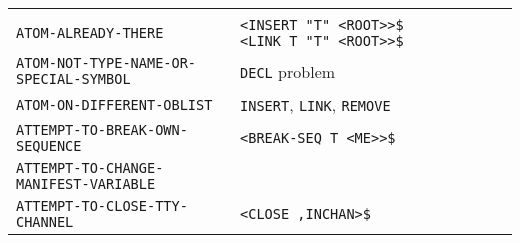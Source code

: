 \documentclass[a4paper,]{article}
\begin{document}
\begin{longtable}[]{@{}ll@{}}
\begin{minipage}[t]{0.36\columnwidth}
\end{minipage}\tabularnewline
\begin{minipage}[t]{0.58\columnwidth}\raggedright\strut
\texttt{ATOM-ALREADY-THERE}\strut
\end{minipage} & \begin{minipage}[t]{0.36\columnwidth}\raggedright\strut
\texttt{\textless{}INSERT\ "T"\ \textless{}ROOT\textgreater{}\textgreater{}\$}
\texttt{\textless{}LINK\ \textquotesingle{}T\ "T"\ \textless{}ROOT\textgreater{}\textgreater{}\$}\strut
\end{minipage}\tabularnewline
\begin{minipage}[t]{0.58\columnwidth}\raggedright\strut
\texttt{ATOM-NOT-TYPE-NAME-OR-SPECIAL-SYMBOL}\strut
\end{minipage} & \begin{minipage}[t]{0.36\columnwidth}\raggedright\strut
\texttt{DECL} problem\strut
\end{minipage}\tabularnewline
\begin{minipage}[t]{0.58\columnwidth}\raggedright\strut
\texttt{ATOM-ON-DIFFERENT-OBLIST}\strut
\end{minipage} & \begin{minipage}[t]{0.36\columnwidth}\raggedright\strut
\texttt{INSERT}, \texttt{LINK}, \texttt{REMOVE}\strut
\end{minipage}\tabularnewline
\begin{minipage}[t]{0.58\columnwidth}\raggedright\strut
\texttt{ATTEMPT-TO-BREAK-OWN-SEQUENCE}\strut
\end{minipage} & \begin{minipage}[t]{0.36\columnwidth}\raggedright\strut
\texttt{\textless{}BREAK-SEQ\ T\ \textless{}ME\textgreater{}\textgreater{}\$}\strut
\end{minipage}\tabularnewline
\begin{minipage}[t]{0.58\columnwidth}\raggedright\strut
\texttt{ATTEMPT-TO-CHANGE-MANIFEST-VARIABLE}\strut
\end{minipage} & \begin{minipage}[t]{0.36\columnwidth}\raggedright\strut
\strut
\end{minipage}\tabularnewline
\begin{minipage}[t]{0.58\columnwidth}\raggedright\strut
\texttt{ATTEMPT-TO-CLOSE-TTY-CHANNEL}\strut
\end{minipage} & \begin{minipage}[t]{0.36\columnwidth}\raggedright\strut
\texttt{\textless{}CLOSE\ ,INCHAN\textgreater{}\$}\strut
\end{minipage}\tabularnewline

\end{longtable}
\end{document}
